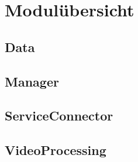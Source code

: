 \section{Modulübersicht}

\subsection{Data} \label{service:modul:Data}

\subsection{Manager} \label{service:modul:Manager}

\subsection{ServiceConnector} \label{service:modul:ServiceConnector}

\subsection{VideoProcessing} \label{service:modul:VideoProcessing}